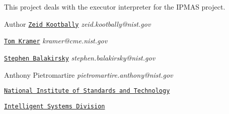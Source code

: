 This project deals with the executor interpreter for the IPMAS project.

\begin{DoxyAuthor}{Author}
\href{http://www.nist.gov/el/isd/ks/kootbally.cfm}{\tt Zeid Kootbally} {\itshape zeid.kootbally@nist.gov\/} 

\href{http://www.nist.gov/el/isd/ks/kramer.cfm}{\tt Tom Kramer} {\itshape kramer@cme.nist.gov\/} 

\href{http://www.nist.gov/el/isd/ks/balakirsky.cfm}{\tt Stephen Balakirsky} {\itshape stephen.balakirsky@nist.gov\/} 

Anthony Pietromartire {\itshape pietromartire.anthony@nist.gov\/} \par
\href{http://www.nist.gov/index.html}{\tt National Institute of Standards and Technology} \par
\href{http://www.nist.gov/el/isd/}{\tt Intelligent Systems Division} 
\end{DoxyAuthor}
